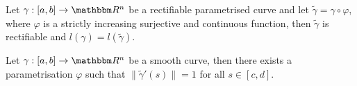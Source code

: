 \documentclass[../Analysis-3]{subfiles}
\begin{document}
\begin{Thm}{}{}\label{thm2:22}
    Let $\gamma : [a,b] \to \R^n$ be a rectifiable parametrised curve and let $\tilde{\gamma} = \gamma \circ \varphi$, where $\varphi$ is a strictly increasing surjective and continuous function, then $\tilde{\gamma}$ is rectifiable and $l(\gamma) = l(\tilde{\gamma})$. 
\end{Thm}

\begin{Thm}{}{}\label{thm3:22}
    Let $\gamma : [a,b] \to \R^n$ be a smooth curve, then there exists a parametrisation $\varphi$ such that $\| \tilde{\gamma}'(s) \| = 1$ for all $s \in [c,d]$.
\end{Thm}
\end{document}
